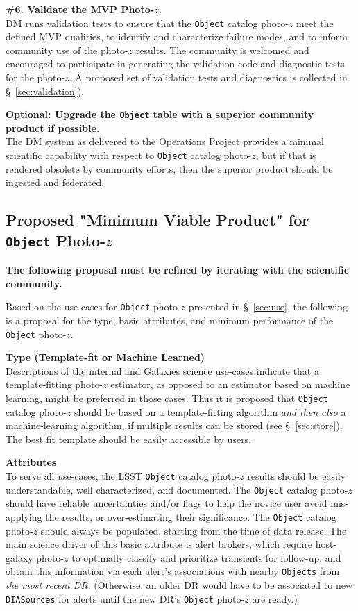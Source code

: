 \documentclass[DM,lsstdraft,toc]{lsstdoc}
\begin{document}
{\bf \#6. Validate the MVP Photo-$z$.}\\
DM runs validation tests to ensure that the {\tt Object} catalog photo-$z$ meet the defined MVP qualities, to identify and characterize failure modes, and to inform community use of the photo-$z$ results. 
The community is welcomed and encouraged to participate in generating the validation code and diagnostic tests for the photo-$z$.
A proposed set of validation tests and diagnostics is collected in \S~\ref{sec:validation}).

{\bf Optional: Upgrade the {\tt Object} table with a superior community product if possible.}\\
The DM system as delivered to the Operations Project provides a minimal scientific capability with respect to {\tt Object} catalog photo-$z$, but if that is rendered obsolete by community efforts, then the superior product should be ingested and federated.


\subsection{Proposed "Minimum Viable Product" for {\tt Object} Photo-$z$}\label{ssec:dmcalc_mvp}

{\bf The following proposal must be refined by iterating with the scientific community.}

Based on the use-cases for {\tt Object} photo-$z$ presented in \S~\ref{sec:use}, the following is a proposal for the type, basic attributes, and minimum performance of the {\tt Object} photo-$z$.

{\bf Type (Template-fit or Machine Learned)}\\
Descriptions of the internal and Galaxies science use-cases indicate that a template-fitting photo-$z$ estimator, as opposed to an estimator based on machine learning, might be preferred in those cases.
Thus it is proposed that  {\tt Object} catalog photo-$z$ should be based on a template-fitting algorithm {\it and then also} a machine-learning algorithm, if multiple results can be stored (see \S~\ref{sec:store}).
The best fit template should be easily accessible by users. 

{\bf Attributes}\\
To serve all use-cases, the LSST {\tt Object} catalog photo-$z$ results should be easily understandable, well characterized, and documented.
The {\tt Object} catalog photo-$z$ should have reliable uncertainties and/or flags to help the novice user avoid mis-applying the results, or over-estimating their significance.
The {\tt Object} catalog photo-$z$ should always be populated, starting from the time of data release.
The main science driver of this basic attribute is alert brokers, which require host-galaxy photo-$z$ to optimally classify and prioritize transients for follow-up, and obtain this information via each alert's associations with nearby {\tt Objects} from {\it the most recent DR}.
(Otherwise, an older DR would have to be associated to new {\tt DIASources} for alerts until the new DR's {\tt Object} photo-$z$ are ready.)
\end{document}
